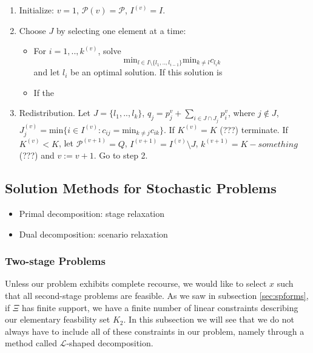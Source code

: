 \begin{enumerate}
\item Initialize: $v=1$, $\mathcal{P}(v) = \mathcal{P}$, $I^{(v)} = I$.
\item Choose $J$ by selecting one element at a time:
  \begin{itemize}
  \item For $i=1,..,k^{(v)}$, solve
        \[
           \text{min}_{l \in I\setminus \{l_1,..,l_{i-1}\}} \text{min}_{k\neq l} c_{l_i k}
        \]
        and let $l_i$ be an optimal solution. If this solution is
  \item If the
  \end{itemize}
\item Redistribution. Let $J = \{l_1, ..,l_k\}$, $q_j = p_j^{v} + \sum_{i\in J\cap J_j} p_i^{v}$,
      where $j\notin J$, $J_j^{(v)} = \text{min} \{i\in I^{(v)} : c_{ij} = \text{min}_{k\neq j} c_{ik}\}$.
      If $K^{(v)} = K$ (???) terminate. If $K^{(v)} < K$, let $\mathcal{P}^{(v+1)} = Q$, $I^{(v+1)}=I^{(v)}\setminus J$,
      $k^{(v+1)} = K-something$ (???) and $v:= v+1$. Go to step 2.
\end{enumerate}


\subsection{Solution Methods for Stochastic Problems}\label{sec:lshape}

\begin{itemize}
\item Primal decomposition: stage relaxation
\item Dual decomposition: scenario relaxation
\end{itemize}

\subsubsection{Two-stage Problems}

Unless our problem exhibits complete recourse, we would like to select $x$ such
that all second-stage problems are feasible. As we saw in subsection \ref{sec:spforms},
if $\Xi$ has finite support, we have a finite number of linear constraints describing
our elementary feasbility set $K_2$. In this subsection we will see that we do not
always have to include all of these constraints in our problem, namely through a
method called $\mathcal{L}$-shaped decomposition.\\

